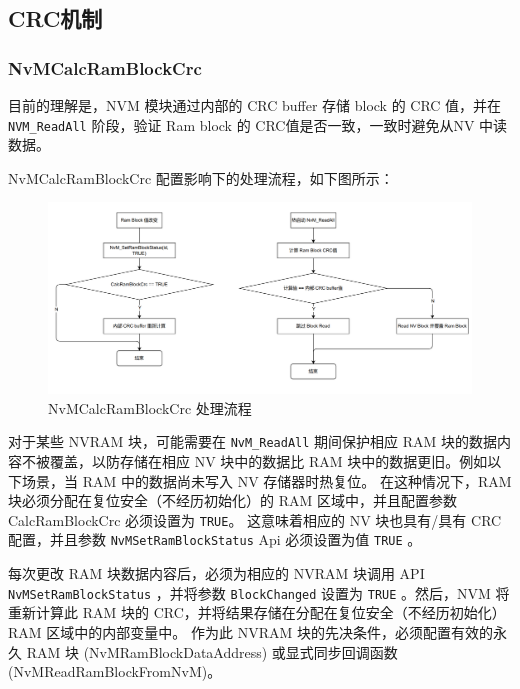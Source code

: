 \subsection{CRC机制}

\subsubsection{NvMCalcRamBlockCrc}
\begin{remark}
  目前的理解是，NVM 模块通过内部的 CRC buffer 存储 block 的 CRC 值，并在 \lstinline{NVM_ReadAll} 阶段，验证 Ram block 的 CRC值是否一致，一致时避免从NV 中读数据。
\end{remark}

NvMCalcRamBlockCrc 配置影响下的处理流程，如下图所示：

\begin{figure}[ht]
  \centering
  \includegraphics[scale=0.35]{pic/NVM_cal_ram_crc.png}
  \caption{NvMCalcRamBlockCrc 处理流程}
  \label{fig:NVM_cal_ram_crc}
\end{figure}

对于某些 NVRAM 块，可能需要在 \lstinline{NvM_ReadAll} 期间保护相应 RAM 块的数据内容不被覆盖，以防存储在相应 NV 块中的数据比 RAM 块中的数据更旧。例如以下场景，当 RAM 中的数据尚未写入 NV 存储器时热复位。
在这种情况下，RAM 块必须分配在复位安全（不经历初始化）的 RAM 区域中，并且配置参数 CalcRamBlockCrc 必须设置为 \lstinline{TRUE}。 这意味着相应的 NV 块也具有/具有 CRC 配置，并且参数 \lstinline{NvMSetRamBlockStatus} Api 必须设置为值 \lstinline{TRUE} 。

每次更改 RAM 块数据内容后，必须为相应的 NVRAM 块调用 API \lstinline{NvMSetRamBlockStatus} ，并将参数 \lstinline{BlockChanged} 设置为 \lstinline{TRUE} 。然后，NVM 将重新计算此 RAM 块的 CRC，并将结果存储在分配在复位安全（不经历初始化）RAM 区域中的内部变量中。
作为此 NVRAM 块的先决条件，必须配置有效的永久 RAM 块 (NvMRamBlockDataAddress) 或显式同步回调函数 (NvMReadRamBlockFromNvM)。

